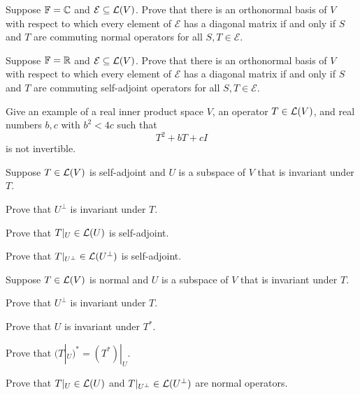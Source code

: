 \begin{exc}
\begin{exercise}
Suppose $\mathbb{F}=\mathbb{C}$ and $\mathcal{E}\subseteq\mathcal{L}(V)$. Prove that there is an
orthonormal basis of $V$ with respect to which every element of $\mathcal{E}$
has a diagonal matrix if and only if $S$ and $T$ are commuting normal operators
for all $S,T\in\mathcal{E}$.
\end{exercise}

\begin{exercise}
Suppose $\mathbb{F}=\mathbb{R}$ and $\mathcal{E}\subseteq\mathcal{L}(V)$. Prove that there is an
orthonormal basis of $V$ with respect to which every element of $\mathcal{E}$
has a diagonal matrix if and only if $S$ and $T$ are commuting self-adjoint
operators for all $S,T\in\mathcal{E}$.
\end{exercise}

\begin{exercise}
Give an example of a real inner product space $V$, an operator $T\in\mathcal{L}(V)$,
and real numbers $b,c$ with $b^2<4c$ such that
\[ T^2+bT+cI \]
is not invertible.
\end{exercise}

\begin{exercise}
Suppose $T\in\mathcal{L}(V)$ is self-adjoint and $U$ is a subspace of $V$ that is
invariant under $T$.
\begin{parts}
\item Prove that $U^\perp$ is invariant under $T$.
\item Prove that $T|_U\in\mathcal{L}(U)$ is self-adjoint.
\item Prove that $T|_{U^\perp}\in\mathcal{L}(U^\perp)$ is self-adjoint.
\end{parts}
\end{exercise}

\begin{exercise}
Suppose $T\in\mathcal{L}(V)$ is normal and $U$ is a subspace of $V$ that is invariant
under $T$.
\begin{parts}
\item Prove that $U^\perp$ is invariant under $T$.
\item Prove that $U$ is invariant under $T^*$.
\item Prove that $(T|_U)^*=(T^*)|_U$.
\item Prove that $T|_U\in\mathcal{L}(U)$ and $T|_{U^\perp}\in\mathcal{L}(U^\perp)$ are normal
  operators.
\end{parts}
\end{exercise}


\end{exc}
